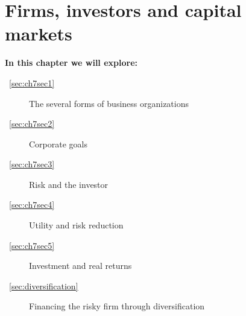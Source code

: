 \chapter{Firms, investors and capital markets} \label{chap:firminvestorcapital}

\begin{topics}
\textbf{In this chapter we will explore:}
\begin{description}
\item [~\ref{sec:ch7sec1}] The several forms of business organizations
\item [~\ref{sec:ch7sec2}] Corporate goals
\item [~\ref{sec:ch7sec3}] Risk and the investor
\item [~\ref{sec:ch7sec4}] Utility and risk reduction
\item [~\ref{sec:ch7sec5}] Investment and real returns
\item [~\ref{sec:diversification}] Financing the risky firm through diversification
\end{description}
\end{topics}